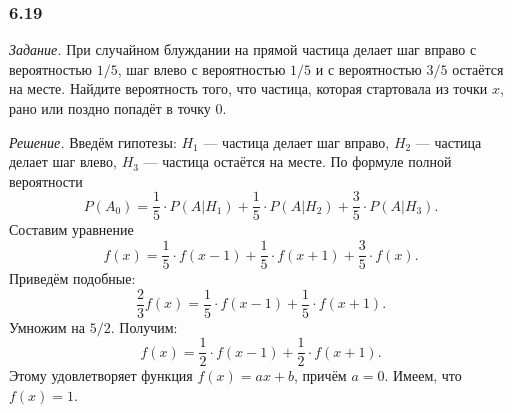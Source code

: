 \subsubsection*{6.19}

\textit{Задание.}
При случайном блуждании на прямой частица делает шаг вправо с вероятностью $1/5$,
шаг влево с вероятностью $1/5$ и с вероятностью $3/5$ остаётся на месте.
Найдите вероятность того, что частица, которая стартовала из точки $x$, рано или поздно попадёт в точку 0.

\textit{Решение.} Введём гипотезы: $H_1$ --- частица делает шаг вправо, $H_2$ --- частица делает шаг влево, $H_3$ --- частица остаётся на месте.
По формуле полной вероятности
$$P \left( A_0 \right) =
\frac{1}{5} \cdot P \left( \left. A \right| H_1 \right) +
\frac{1}{5} \cdot P \left( \left. A \right| H_2 \right) + \frac{3}{5} \cdot P \left( \left. A \right| H_3 \right).$$
Составим уравнение
$$f \left( x \right) =
\frac{1}{5} \cdot f \left( x-1 \right) + \frac{1}{5} \cdot f \left( x+1 \right) + \frac{3}{5} \cdot f \left( x \right).$$
Приведём подобные:
$$ \frac{2}{3} f \left( x \right) =
\frac{1}{5} \cdot f \left( x-1 \right) + \frac{1}{5} \cdot f \left( x+1 \right).$$
Умножим на $5/2$.
Получим:
$$f \left( x \right) =
\frac{1}{2} \cdot f \left( x-1 \right) + \frac{1}{2} \cdot f \left( x+1 \right).$$
Этому удовлетворяет функция $f \left( x \right) = ax + b$, причём $a = 0$.
Имеем, что $f \left( x \right) =1$.
